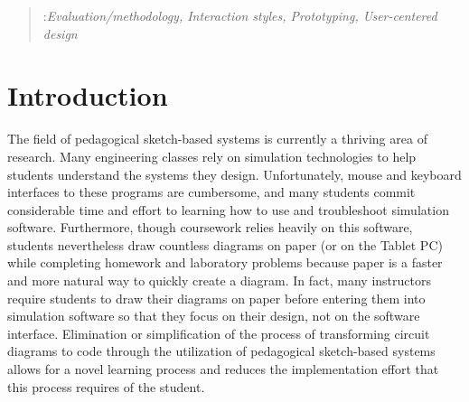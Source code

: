 \documentclass{egpubl}
\begin{document}
\begin{abstract}

\begin{classification} %
:\textit{Evaluation/methodology, Interaction styles, Prototyping, User-centered design}
\end{classification}

\begin{classification} %
\end{classification}




\end{abstract}


\section{Introduction}


The field of pedagogical sketch-based systems is currently a thriving
area of research.  Many engineering classes rely on
simulation technologies to help students understand the systems they
design.  Unfortunately, mouse and keyboard interfaces to these
programs are cumbersome, and many students commit considerable time
and effort to learning how to use and troubleshoot simulation
software.  Furthermore, though coursework relies heavily on this
software, students nevertheless draw countless diagrams on paper (or
on the Tablet PC) while completing homework and laboratory problems
because paper is a faster and more natural way to quickly create a
diagram.  In fact, many instructors require students to draw their
diagrams on paper before entering them into simulation software so
that they focus on their design, not on the software interface.
Elimination or simplification of the process of transforming circuit
diagrams to code through the utilization of pedagogical sketch-based
systems allows for a novel learning process and reduces the
implementation effort that this process requires of the student.
\end{document}
